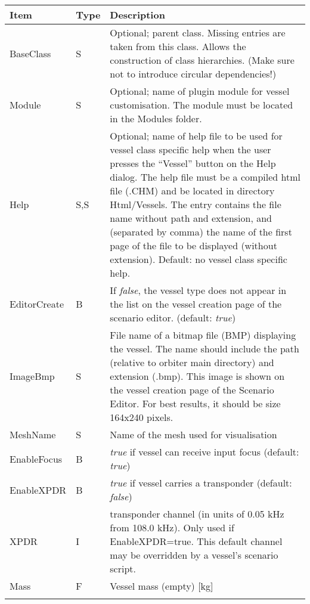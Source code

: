 \documentclass[Orbiter Developer Manual.tex]{subfiles}
\begin{document}
	\begin{longtable}{ |p{}|p{}|p{}| }
	\hline\rule{0pt}{2ex}
	\textbf{Item} & \textbf{Type} & \textbf{Description}\\
	\hline\rule{0pt}{2ex}
	BaseClass & S & Optional; parent class. Missing entries are taken from this class. Allows the construction of class hierarchies. (Make sure not to introduce circular dependencies!)\\
	\hline\rule{0pt}{2ex}
	Module & S & Optional; name of plugin module for vessel customisation. The module must be located in the Modules folder.\\
	\hline\rule{0pt}{2ex}
	Help & S,S & Optional; name of help file to be used for vessel class specific help when the user presses the “Vessel” button on the Help dialog. The help file must be a compiled html file (.CHM) and be located in directory Html/Vessels. The entry contains the file name without path and extension, and (separated by comma) the name of the first page of the file to be displayed (without extension). Default: no vessel class specific help.\\
	\hline\rule{0pt}{2ex}
	EditorCreate & B & If \textit{false}, the vessel type does not appear in the list on the vessel creation page of the scenario editor. (default: \textit{true})\\
	\hline\rule{0pt}{2ex}
	ImageBmp & S & File name of a bitmap file (BMP) displaying the vessel. The name should include the path (relative to orbiter main directory) and extension (.bmp). This image is shown on the vessel creation page of the Scenario Editor. For best results, it should be size 164x240 pixels.\\
	\hline\rule{0pt}{2ex}
	MeshName & S & Name of the mesh used for visualisation\\
	\hline\rule{0pt}{2ex}
	EnableFocus & B & \textit{true} if vessel can receive input focus (default: \textit{true})\\
	\hline\rule{0pt}{2ex}
	EnableXPDR & B & \textit{true} if vessel carries a transponder (default: \textit{false})\\
	\hline\rule{0pt}{2ex}
	XPDR & I & transponder channel (in units of 0.05 kHz from 108.0 kHz). Only used if EnableXPDR=true. This default channel may be overridden by a vessel’s scenario script.\\
	\hline\rule{0pt}{2ex}
	Mass & F & Vessel mass (empty) [kg]\\
	\hline\rule{0pt}{2ex}

\end{longtable}
\end{document}
